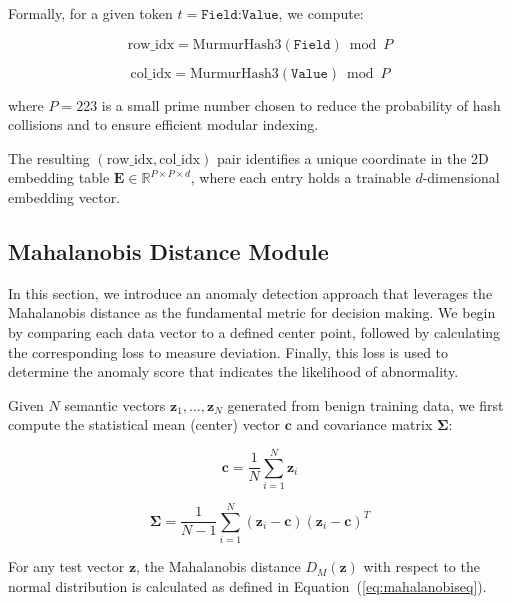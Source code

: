 \begin{ZhChapter}
    Formally, for a given token $t = \texttt{Field:Value}$, we compute:

    \begin{equation}
        \text{row\_idx} = \text{MurmurHash3}(\texttt{Field}) \bmod P
    \end{equation}

    \begin{equation}
        \text{col\_idx} = \text{MurmurHash3}(\texttt{Value}) \bmod P
    \end{equation}

    where $P = 223$ is a small prime number chosen to reduce the probability of hash collisions and to ensure efficient modular indexing.

    The resulting $(\text{row\_idx}, \text{col\_idx})$ pair identifies a unique coordinate in the 2D embedding table $\mathbf{E} \in \mathbb{R}^{P \times P \times d}$, where each entry holds a trainable $d$-dimensional embedding vector.




    \subsection{Mahalanobis Distance Module}
    In this section, we introduce an anomaly detection approach that leverages the Mahalanobis distance as the fundamental metric for decision making. We begin by comparing each data vector to a defined center point, followed by calculating the corresponding loss to measure deviation. Finally, this loss is used to determine the anomaly score that indicates the likelihood of abnormality.

    Given $N$ semantic vectors $\mathbf{z}_1, \dots, \mathbf{z}_N$ generated from benign training data, we first compute the statistical mean (center) vector $\boldsymbol{c}$ and covariance matrix $\boldsymbol{\Sigma}$:

    \begin{equation}
        \boldsymbol{c} = \frac{1}{N} \sum_{i=1}^{N} \mathbf{z}_i
    \end{equation}

    \begin{equation}
        \boldsymbol{\Sigma} = \frac{1}{N - 1} \sum_{i=1}^{N} (\mathbf{z}_i - \boldsymbol{c})(\mathbf{z}_i - \boldsymbol{c})^T
    \end{equation}



    For any test vector $\mathbf{z}$, the Mahalanobis distance $D_M(\mathbf{z})$ with respect to the normal distribution is calculated as defined in Equation~(\ref{eq:mahalanobiseq}).





\end{ZhChapter}
